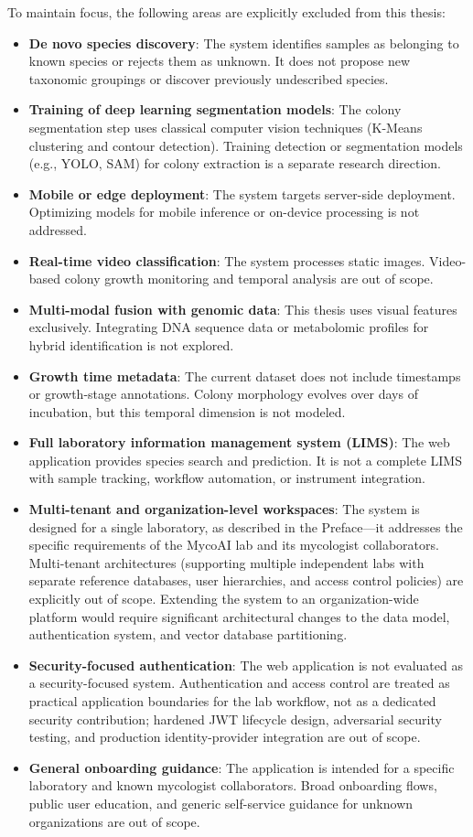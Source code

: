 To maintain focus, the following areas are explicitly excluded from this thesis:

\begin{itemize}
\item
  \textbf{De novo species discovery}: The system identifies samples as belonging to known species or rejects them as unknown. It does not propose new taxonomic groupings or discover previously undescribed species.
\item
  \textbf{Training of deep learning segmentation models}: The colony segmentation step uses classical computer vision techniques (K-Means clustering and contour detection). Training detection or segmentation models (e.g., YOLO, SAM) for colony extraction is a separate research direction.
\item
  \textbf{Mobile or edge deployment}: The system targets server-side deployment. Optimizing models for mobile inference or on-device processing is not addressed.
\item
  \textbf{Real-time video classification}: The system processes static images. Video-based colony growth monitoring and temporal analysis are out of scope.
\item
  \textbf{Multi-modal fusion with genomic data}: This thesis uses visual features exclusively. Integrating DNA sequence data or metabolomic profiles for hybrid identification is not explored.
\item
  \textbf{Growth time metadata}: The current dataset does not include timestamps or growth-stage annotations. Colony morphology evolves over days of incubation, but this temporal dimension is not modeled.
\item
  \textbf{Full laboratory information management system (LIMS)}: The web application provides species search and prediction. It is not a complete LIMS with sample tracking, workflow automation, or instrument integration.
\item
  \textbf{Multi-tenant and organization-level workspaces}: The system is designed for a single laboratory, as described in the Preface---it addresses the specific requirements of the MycoAI lab and its mycologist collaborators. Multi-tenant architectures (supporting multiple independent labs with separate reference databases, user hierarchies, and access control policies) are explicitly out of scope. Extending the system to an organization-wide platform would require significant architectural changes to the data model, authentication system, and vector database partitioning.
\item
  \textbf{Security-focused authentication}: The web application is not evaluated as a security-focused system. Authentication and access control are treated as practical application boundaries for the lab workflow, not as a dedicated security contribution; hardened JWT lifecycle design, adversarial security testing, and production identity-provider integration are out of scope.
\item
  \textbf{General onboarding guidance}: The application is intended for a specific laboratory and known mycologist collaborators. Broad onboarding flows, public user education, and generic self-service guidance for unknown organizations are out of scope.
\end{itemize}

